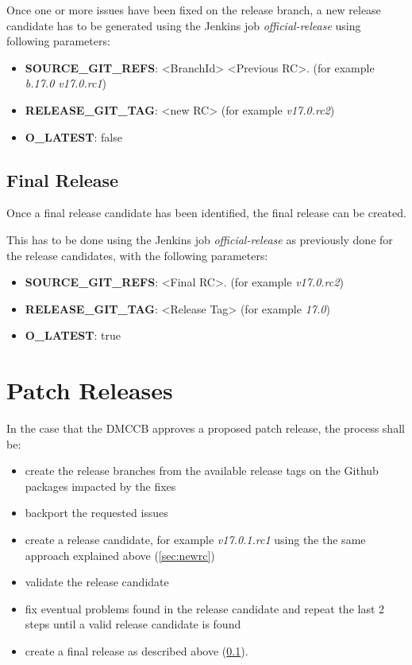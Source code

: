Once one or more issues have been fixed on the release branch, a new release candidate has to be generated using the Jenkins job \textit{official-release} using following parameters:

\begin{itemize}
\item {\bf SOURCE\_GIT\_REFS}: <BranchId> <Previous RC>. (for example \textit{b.17.0 v17.0.rc1})
\item {\bf RELEASE\_GIT\_TAG}: <new RC> (for example \textit{v17.0.rc2})
\item {\bf O\_LATEST}: false
\end{itemize}

\subsection{Final Release} \label{sec:finalrelease}

Once a final release candidate has been identified, the final release can be created.

This has to be done using the Jenkins job \textit{official-release} as previously done for the release candidates, with the following parameters:

\begin{itemize}
\item {\bf SOURCE\_GIT\_REFS}: <Final RC>. (for example \textit{v17.0.rc2})
\item {\bf RELEASE\_GIT\_TAG}: <Release Tag> (for example \textit{17.0})
\item {\bf O\_LATEST}: true
\end{itemize}

\newpage

\section{Patch Releases} \label{sec:patchreleases}

In the case that the DMCCB approves a proposed patch release, the process shall be:

\begin{itemize}
\item create the release branches from the available release tags on the Github packages impacted by the fixes
\item backport the requested issues
\item create a release candidate, for example \textit{v17.0.1.rc1} using the the same approach explained above (\ref{sec:newrc})
\item validate the release candidate
\item fix eventual problems found in the release candidate and repeat the last 2 steps until a valid release candidate is found
\item create a final release as described above (\ref{sec:finalrelease}).
\end{itemize}


